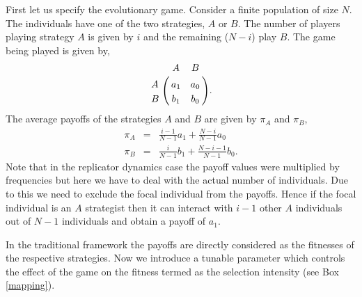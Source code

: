 \documentclass[oneside,11pt,a4paper]{book}
\begin{document}
First let us specify the evolutionary game.
Consider a finite population of size $N$.
The individuals have one of the two strategies, $A$ or $B$.
The number of players playing strategy $A$ is given by $i$ and the remaining ($N-i$) play $B$.
The game being played is given by,
%
\begin{eqnarray}
\bordermatrix{
&A&B\cr
A&a_1 & a_0\cr
B& b_1 & b_{0}
}.
\end{eqnarray}
%
The average payoffs of the strategies $A$ and $B$ are given by $\pi_A$ and $\pi_B$,
%
\begin{eqnarray}
\pi_A &=& \frac{i-1}{N-1} a_1 + \frac{N-i}{N-1} a_0 \nonumber \\
\pi_B &=& \frac{i}{N-1} b_1 + \frac{N-i-1}{N-1} b_0 .
\label{finitepayoffs}
\end{eqnarray}
%
Note that in the replicator dynamics case the payoff values were multiplied by frequencies but here we have to deal with the actual number of individuals.
Due to this we need to exclude the focal individual from the payoffs.
Hence if the focal individual is an $A$ strategist then it can interact with $i-1$ other $A$ individuals out of $N-1$ individuals and obtain a payoff of $a_1$.

In the traditional framework the payoffs are directly considered as the fitnesses of the respective strategies.
Now we introduce a tunable parameter which controls the effect of the game on the fitness termed as the selection intensity (see Box \ref{mapping}).\\
\end{document}
